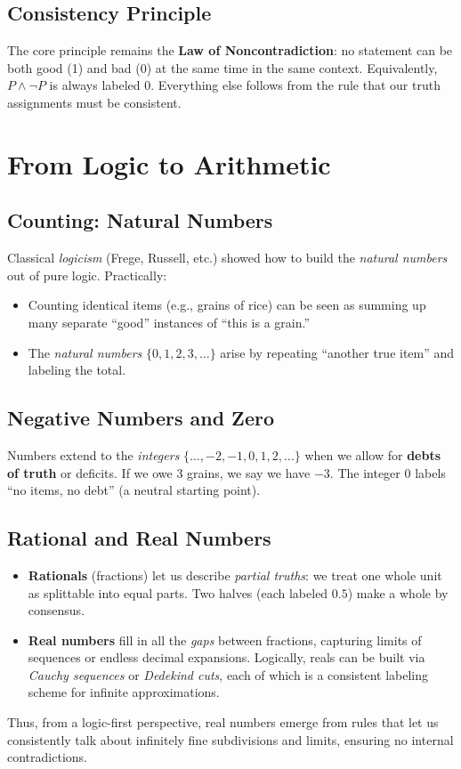 \documentclass[12pt]{article}
\begin{document}
\subsection{Consistency Principle}
The core principle remains the \textbf{Law of Noncontradiction}: no
statement can be both good (1) and bad (0) at the same time in the
same context. Equivalently, $P \wedge \lnot P$ is always labeled 0.
Everything else follows from the rule that our truth assignments must
be consistent.

\section{From Logic to Arithmetic}
\label{sec:logic-arith}

\subsection{Counting: Natural Numbers}
Classical \emph{logicism} (Frege, Russell, etc.) showed how to build
the \emph{natural numbers} out of pure logic. Practically:
\begin{itemize}
  \item Counting identical items (e.g., grains of rice) can be seen as
  summing up many separate ``good'' instances of ``this is a grain.''
  \item The \emph{natural numbers} $\{0,1,2,3,\dots\}$ arise by repeating
  ``another true item'' and labeling the total.
\end{itemize}

\subsection{Negative Numbers and Zero}
Numbers extend to the \emph{integers} $\{\dots,-2,-1,0,1,2,\dots\}$ when
we allow for \textbf{debts of truth} or deficits. If we owe 3 grains,
we say we have $-3$. The integer $0$ labels ``no items, no debt''
(a neutral starting point).

\subsection{Rational and Real Numbers}
\begin{itemize}
  \item \textbf{Rationals} (fractions) let us describe \emph{partial
  truths}: we treat one whole unit as splittable into equal parts. 
  Two halves (each labeled $0.5$) make a whole by consensus.
  \item \textbf{Real numbers} fill in all the \emph{gaps} between
  fractions, capturing limits of sequences or endless decimal expansions.
  Logically, reals can be built via \emph{Cauchy sequences} or \emph{Dedekind
  cuts}, each of which is a consistent labeling scheme for infinite
  approximations.
\end{itemize}
Thus, from a logic-first perspective, real numbers emerge from rules
that let us consistently talk about infinitely fine subdivisions and
limits, ensuring no internal contradictions.
\end{document}
